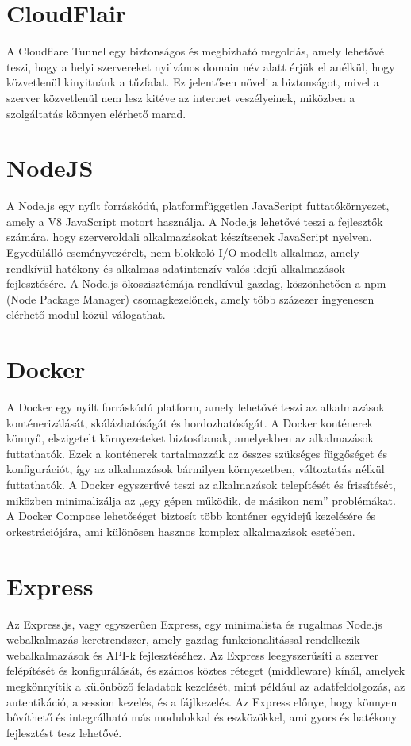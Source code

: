 \section{CloudFlair}
A Cloudflare Tunnel egy biztonságos és megbízható megoldás, amely lehetővé teszi, hogy a helyi szervereket nyilvános domain név alatt érjük el anélkül, hogy közvetlenül kinyitnánk a tűzfalat. Ez jelentősen növeli a biztonságot, mivel a szerver közvetlenül nem lesz kitéve az internet veszélyeinek, miközben a szolgáltatás könnyen elérhető marad.

\section{NodeJS}
A Node.js egy nyílt forráskódú, platformfüggetlen JavaScript futtatókörnyezet, amely a V8 JavaScript motort használja. A Node.js lehetővé teszi a fejlesztők számára, hogy szerveroldali alkalmazásokat készítsenek JavaScript nyelven. Egyedülálló eseményvezérelt, nem-blokkoló I/O modellt alkalmaz, amely rendkívül hatékony és alkalmas adatintenzív valós idejű alkalmazások fejlesztésére. A Node.js ökoszisztémája rendkívül gazdag, köszönhetően a npm (Node Package Manager) csomagkezelőnek, amely több százezer ingyenesen elérhető modul közül válogathat.

\section{Docker}
A Docker egy nyílt forráskódú platform, amely lehetővé teszi az alkalmazások konténerizálását, skálázhatóságát és hordozhatóságát. A Docker konténerek könnyű, elszigetelt környezeteket biztosítanak, amelyekben az alkalmazások futtathatók. Ezek a konténerek tartalmazzák az összes szükséges függőséget és konfigurációt, így az alkalmazások bármilyen környezetben, változtatás nélkül futtathatók. A Docker egyszerűvé teszi az alkalmazások telepítését és frissítését, miközben minimalizálja az „egy gépen működik, de másikon nem” problémákat. A Docker Compose lehetőséget biztosít több konténer egyidejű kezelésére és orkestrációjára, ami különösen hasznos komplex alkalmazások esetében.

\section{Express}
Az Express.js, vagy egyszerűen Express, egy minimalista és rugalmas Node.js webalkalmazás keretrendszer, amely gazdag funkcionalitással rendelkezik webalkalmazások és API-k fejlesztéséhez. Az Express leegyszerűsíti a szerver felépítését és konfigurálását, és számos köztes réteget (middleware) kínál, amelyek megkönnyítik a különböző feladatok kezelését, mint például az adatfeldolgozás, az autentikáció, a session kezelés, és a fájlkezelés. Az Express előnye, hogy könnyen bővíthető és integrálható más modulokkal és eszközökkel, ami gyors és hatékony fejlesztést tesz lehetővé.

